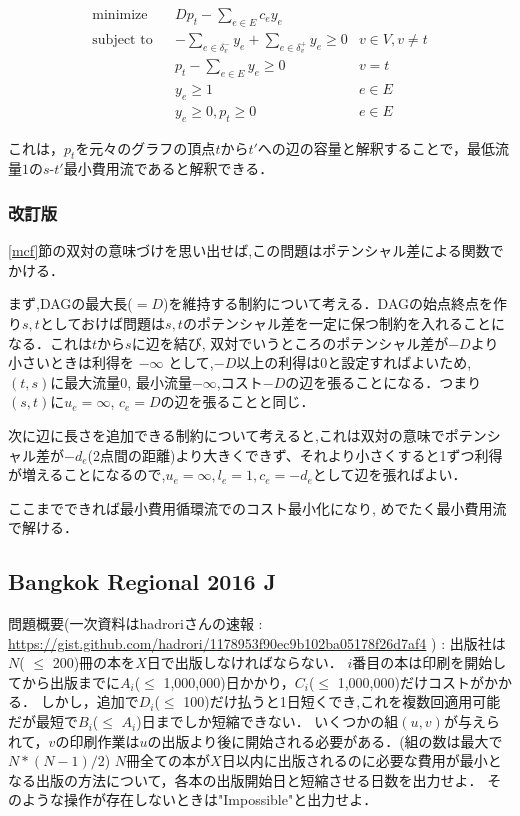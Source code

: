 \documentclass[13pt]{jarticle}
\theoremstyle{nonitalic} %
\begin{document}
\begin{align}
  &&&&& \textrm{minimize}   && Dp_t - \sum_{e \in E} c_e y_e \\
  &&&&& \textrm{subject to} && -\sum_{e \in \delta_v^- } y_e + \sum_{e \in \delta_v^+ } y_e \geq 0 & v \in V, v\neq t &&&&&\\
  &&&&&                     && p_t - \sum_{e \in E} y_e \geq 0 & v=t \\
  &&&&&                     && y_e \geq 1  & e \in E\\
  &&&&&                     && y_e \geq 0, p_t \geq 0 & e\in E
\end{align}


これは，$p_t$を元々のグラフの頂点$t$から$t'$への辺の容量と解釈することで，最低流量$1$の$s$-$t'$最小費用流であると解釈できる．

\subsubsection{改訂版}
\ref{mcf}節の双対の意味づけを思い出せば,この問題はポテンシャル差による関数でかける．

まず,DAGの最大長($=D$)を維持する制約について考える．DAGの始点終点を作り$s,t$としておけば問題は$s,t$のポテンシャル差を一定に保つ制約を入れることになる．これは$t$から$s$に辺を結び, 双対でいうところのポテンシャル差が$-D$より小さいときは利得を $-\infty$ として,$-D$以上の利得は0と設定すればよいため,
$(t,s)$に最大流量0, 最小流量$-\infty$,コスト$-D$の辺を張ることになる．つまり$(s,t)$に$u_e = \infty$, $c_e=D$の辺を張ることと同じ．

次に辺に長さを追加できる制約について考えると,これは双対の意味でポテンシャル差が$-d_e$(2点間の距離)より大きくできず、それより小さくすると1ずつ利得が増えることになるので,$u_e = \infty, l_e=1, c_e = -d_e $として辺を張ればよい．

ここまでできれば最小費用循環流でのコスト最小化になり, めでたく最小費用流で解ける．

\subsection{Bangkok Regional 2016 J }
\label{bangkok}
問題概要(一次資料はhadroriさんの速報 : \url{https://gist.github.com/hadrori/1178953f90ec9b102ba05178f26d7af4} ) : 
出版社は$N$( $\leq$ 200)冊の本を$X$日で出版しなければならない．
$i$番目の本は印刷を開始してから出版までに$A_i$($\leq$ 1,000,000)日かかり，$C_i$($\leq$ 1,000,000)だけコストがかかる．
しかし，追加で$D_i$($\leq$ 100)だけ払うと1日短くでき,これを複数回適用可能だが最短で$B_i$($\leq$ $A_i$)日までしか短縮できない．
いくつかの組$(u,v)$が与えられて，$v$の印刷作業は$u$の出版より後に開始される必要がある．(組の数は最大で$N*(N-1)/2$)
$N$冊全ての本が$X$日以内に出版されるのに必要な費用が最小となる出版の方法について，各本の出版開始日と短縮させる日数を出力せよ．
そのような操作が存在しないときは"Impossible"と出力せよ．
\end{document}
